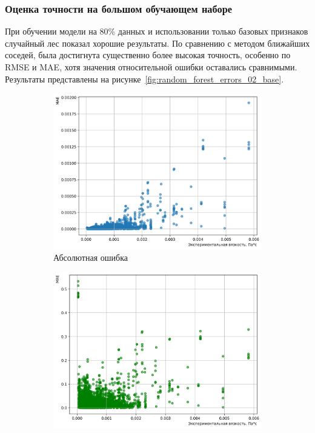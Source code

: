 \documentclass[a4paper,12pt]{article}
\begin{document}
    \subsubsection{Оценка точности на большом обучающем наборе}
    
    При обучении модели на 80\% данных и использовании только базовых признаков случайный лес показал хорошие результаты. По сравнению с методом ближайших соседей, была достигнута существенно более высокая точность, особенно по RMSE и MAE, хотя значения относительной ошибки оставались сравнимыми. Результаты представлены на рисунке~\autoref{fig:random_forest_errors_02_base}.
    
    \begin{figure}[ht!]
      \centering
      \begin{subfigure}{0.48\textwidth}
          \centering
          \includegraphics[width=\linewidth]{random_forest/MAE_Random Forest Model_0.2_base.png}
          \caption{Абсолютная ошибка}
      \end{subfigure}
      \hfill
      \begin{subfigure}{0.48\textwidth}
          \centering
          \includegraphics[width=\linewidth]{random_forest/MRE_Random Forest Model_0.2_base.png}

\end{subfigure}
\end{figure}
\end{document}
